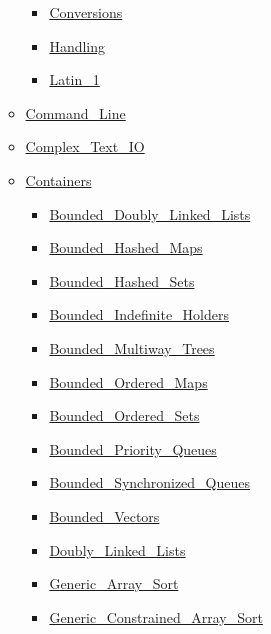 \documentclass[english]{article}
\begin{document}
\begin{scriptsize}
\begin{multicols*}{5}
\begin{itemize}[leftmargin=0mm]
\begin{itemize}[leftmargin=5mm]
\begin{itemize}[leftmargin=5mm]
	\item[] \href{http://www.ada-auth.org/standards/22rm/html/RM-A-3-4.html}{Conversions}
	\item[] \href{http://www.ada-auth.org/standards/22rm/html/RM-A-3-2.html}{Handling}
	\item[] \href{http://www.ada-auth.org/standards/22rm/html/RM-A-3-3.html}{Latin\_1}
	\end{itemize}
  \item[] \href{http://www.ada-auth.org/standards/22rm/html/RM-A-15.html}{Command\_Line}
  \item[] \href{http://www.ada-auth.org/standards/22rm/html/RM-G-1-3.html}{Complex\_Text\_IO}
  \item[] \href{http://www.ada-auth.org/standards/22rm/html/RM-A-18-1.html}{Containers}
	\begin{itemize}[leftmargin=5mm]
	\item[] \href{http://www.ada-auth.org/standards/22rm/html/RM-A-18-20.html}{Bounded\_Doubly\_Linked\_Lists}
	\item[] \href{http://www.ada-auth.org/standards/22rm/html/RM-A-18-21.html}{Bounded\_Hashed\_Maps}
	\item[] \href{http://www.ada-auth.org/standards/22rm/html/RM-A-18-23.html}{Bounded\_Hashed\_Sets}
	\item[] \href{http://www.ada-auth.org/standards/22rm/html/RM-A-18-32.html}{Bounded\_Indefinite\_Holders}
	\item[] \href{http://www.ada-auth.org/standards/22rm/html/RM-A-18-25.html}{Bounded\_Multiway\_Trees}
	\item[] \href{http://www.ada-auth.org/standards/22rm/html/RM-A-18-22.html}{Bounded\_Ordered\_Maps}
	\item[] \href{http://www.ada-auth.org/standards/22rm/html/RM-A-18-24.html}{Bounded\_Ordered\_Sets}
	\item[] \href{http://www.ada-auth.org/standards/22rm/html/RM-A-18-31.html}{Bounded\_Priority\_Queues}
	\item[] \href{http://www.ada-auth.org/standards/22rm/html/RM-A-18-29.html}{Bounded\_Synchronized\_Queues}
	\item[] \href{http://www.ada-auth.org/standards/22rm/html/RM-A-18-19.html}{Bounded\_Vectors}
	\item[] \href{http://www.ada-auth.org/standards/22rm/html/RM-A-18-3.html}{Doubly\_Linked\_Lists}
	\item[] \href{http://www.ada-auth.org/standards/22rm/html/RM-A-18-26.html}{Generic\_Array\_Sort}
	\item[] \href{http://www.ada-auth.org/standards/22rm/html/RM-A-18-26.html}{Generic\_Constrained\_Array\_Sort}

\end{itemize}
\end{itemize}
\end{itemize}
\end{multicols*}
\end{scriptsize}
\end{document}
